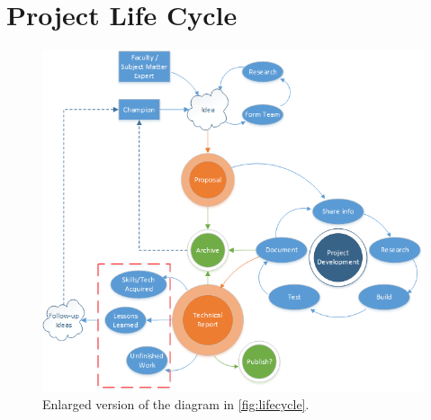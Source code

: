 \documentclass[journal]{SPEXformat}
\begin{document}
\section{Project Life Cycle}
\begin{figure}[h]
  \centering
  \includegraphics[]{figs/project-life-cycle.png}
  \caption{Enlarged version of the diagram in \autoref{fig:lifecycle}.}
\end{figure}
\end{document}
